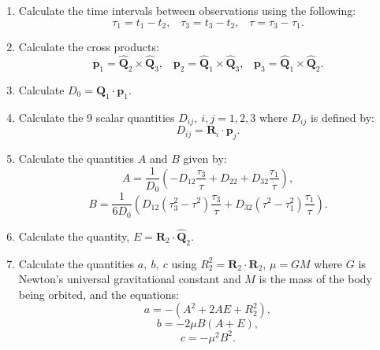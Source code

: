 \documentclass[10pt, twocolumn]{revtex4}    %
\begin{document}
\begin{enumerate}
 \item Calculate the time intervals between observations using the following:
 \begin{equation}
 \tau_1 = t_1 - t_2, \hspace{10pt} \tau_3 = t_3 - t_2, \hspace{10pt} \tau = \tau_3 - \tau_1.
 \end{equation}
 \item Calculate the cross products: 
 \begin{equation}
 \mathbf{p}_1 = \mathbf{\hat{Q}}_2 \times \mathbf{\hat{Q}}_3, \hspace{10pt} \mathbf{p}_2 = \mathbf{\hat{Q}}_1 \times \mathbf{\hat{Q}}_3, \hspace{10pt} \mathbf{p}_3 = \mathbf{\hat{Q}}_1 \times \mathbf{\hat{Q}}_2.
 \end{equation}
 \item Calculate $D_0 = \mathbf{\hat{Q}}_1 \cdot \mathbf{p}_1$.
 \item Calculate the 9 scalar quantities $D_{ij},\ i,j=1,2,3$ where $D_{ij}$ is defined by:
 \begin{equation}
 D_{ij} = \mathbf{R}_i \cdot \mathbf{p}_j.
 \end{equation} 
 \item Calculate the quantities $A$ and $B$ given by:
 \begin{equation}
 A = \frac{1}{D_0}\left(-D_{12}\frac{\tau_3}{\tau} +D_{22} + D_{32} \frac{\tau_1}{\tau} \right),
 \end{equation}
 \begin{equation}
 B = \frac{1}{6D_0} \left(D_{12}(\tau^2_3 - \tau^2)\frac{\tau_3}{\tau} + D_{32}(\tau^2 - \tau_1^2)\frac{\tau_1}{\tau}\right).
 \end{equation}
 \item Calculate the quantity, $E = \mathbf{R}_2 \cdot \mathbf{\hat{Q}}_2$.
 \item Calculate the quantities $a,\ b,\ c$ using $R_2^2 = \mathbf{R}_2 \cdot \mathbf{R}_2$, $\mu=GM$ where $G$ is Newton's universal gravitational constant and $M$ is the mass of the body being orbited, and the equations:
 \begin{equation}
 a = -(A^2 + 2AE + R_2^2),
 \end{equation}
 \begin{equation}
 b = -2\mu B(A+E),
 \end{equation}
 \begin{equation}
 c = -\mu^2B^2.

\end{equation}
\end{enumerate}
\end{document}
